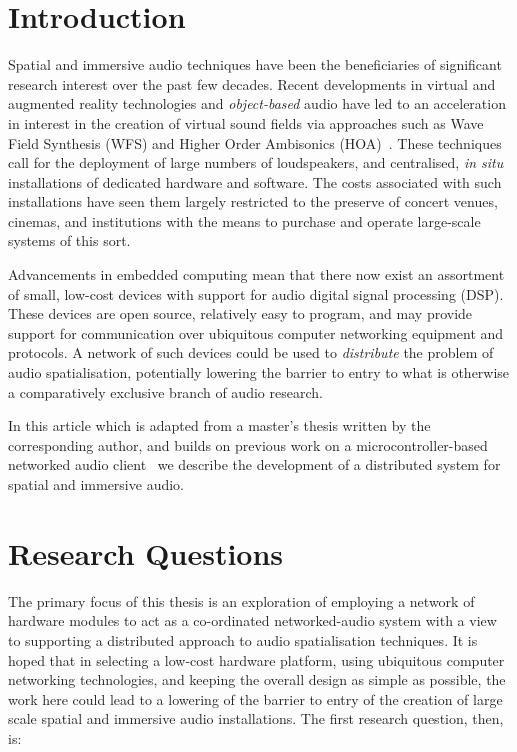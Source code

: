 \section{Introduction}\label{sec:introduction}

Spatial and immersive audio techniques have been the beneficiaries of
significant research interest over the past few decades.
Recent developments in virtual and augmented reality technologies and
\textit{object-based} audio have led to an acceleration in interest in the
creation of virtual sound fields via approaches such as Wave Field Synthesis
(WFS) and Higher Order Ambisonics (HOA)~\citep{berkhout_acoustic_1993,
    ahrens_theory_2008,daniel_further_2003,frank_producing_2015}.
These techniques call for the deployment of large numbers of loudspeakers, and
centralised, \textit{in situ} installations of dedicated hardware and software.
The costs associated with such installations have seen them largely restricted
to the preserve of concert venues, cinemas, and institutions with the means to
purchase and operate large-scale systems of this sort.

Advancements in embedded computing mean that there now exist an assortment of
small, low-cost devices with support for audio digital signal processing (DSP).
These devices are open source, relatively easy to program, and may provide
support for communication over ubiquitous computer networking equipment and
protocols.
A network of such devices could be used to \textit{distribute} the problem of
audio spatialisation, potentially lowering the barrier to entry to what is
otherwise a comparatively exclusive branch of audio research.

In this article \textemdash{} which is adapted from a master's thesis written by
the corresponding author, and builds on previous work on a microcontroller-based
networked audio client~\citep{rushton_microcontroller-based_2023} \textemdash{}
we describe the development of a distributed system for spatial and immersive
audio.






\section{Research Questions}\label{s:research-questions}

The primary focus of this thesis is an exploration of employing a
network of hardware modules to act as a co-ordinated networked-audio system
with a view to supporting a distributed approach to audio spatialisation
techniques.
It is hoped that in selecting a low-cost hardware platform, using ubiquitous
computer networking technologies, and keeping the overall design as simple as
possible, the work here could lead to a lowering of the barrier to entry of
the creation of large scale spatial and immersive audio installations.
The first research question, then, is:

